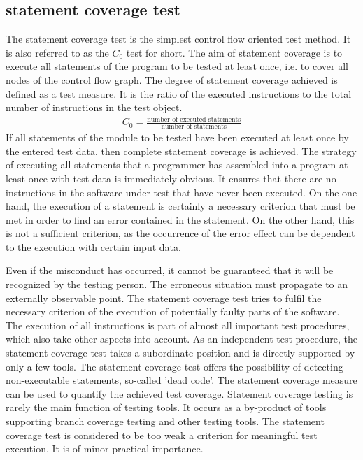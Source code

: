 \documentclass[master,english,smartquotes,apa]{hgbthesis}
\begin{document}
	\subsection{statement coverage test}
	The statement coverage test is the simplest control flow oriented test method. It is also referred to as the $C_0$ test for short. The aim of statement coverage is to execute all statements of the program to be tested at least once, i.e. to cover all nodes of the control flow graph. The degree of statement coverage achieved is defined as a test measure. It is the ratio of the executed instructions to the total number of instructions in the test object.
		\begin{align*}
		C_0 = \frac{\textrm{number of executed statements}}{\textrm{number of statements}}
		\end{align*}
	If all statements of the module to be tested have been executed at least once by the entered test data, then complete statement coverage is achieved. The strategy of executing all statements that a programmer has assembled into a program at least once with test data is immediately obvious. It ensures that there are no instructions in the software under test that have never been executed. On the one hand, the execution of a statement is certainly a necessary criterion that must be met in order to find an error contained in the statement. On the other hand, this is not a sufficient criterion, as the occurrence of the error effect can be dependent to the execution with certain input data. 
	
	Even if the misconduct has occurred, it cannot be guaranteed that it will be recognized by the testing person. The erroneous situation must propagate to an externally observable point. The statement coverage test tries to fulfil the necessary criterion of the execution of potentially faulty parts of the software. The execution of all instructions is part of almost all important test procedures, which also take other aspects into account. As an independent test procedure, the statement coverage test takes a subordinate position and is directly supported by only a few tools. The statement coverage test offers the possibility of detecting non-executable statements, so-called 'dead code'. The statement coverage measure can be used to quantify the achieved test coverage. Statement coverage testing is rarely the main function of testing tools. It occurs as a by-product of tools supporting branch coverage testing and other testing tools. The statement coverage test is considered to be too weak a criterion for meaningful test execution. It is of minor practical importance.
\end{document}
